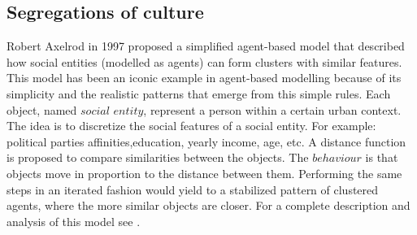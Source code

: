 \documentclass[fleqn,10pt]{SelfArx} %
\newlength{\tocsep}
\begin{document}
\subsection{Segregations of culture}
Robert Axelrod in 1997 proposed a simplified agent-based model that described how social entities (modelled as agents) can form clusters with similar features. This model has been an iconic example in agent-based modelling because of its simplicity and the realistic patterns that emerge from this simple rules.   
Each object, named $social$ $entity$, represent a person within a certain urban context. The idea is to discretize the social features of a social entity. For example: political parties affinities,education, yearly income, age, etc. A distance function is proposed to compare similarities between the objects. The $behaviour$ is that objects move in proportion to the distance between them. Performing the same steps in an iterated fashion would yield to a stabilized pattern of clustered agents, where the more similar objects are closer. For a complete description and analysis of this model see \citep{axelrod1997}. 


\end{document}
